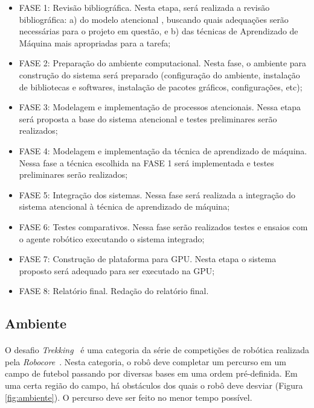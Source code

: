 \documentclass[11pt]{article}
\newcommand{\tit}[1]{\textit{#1}}
\begin{document}
\begin{itemize}
	\item FASE  1:  Revisão  bibliográfica. Nesta etapa, será realizada a revisão bibliográfica:  a) do  modelo  atencional \cite{esther}, buscando quais adequações serão necessárias para o projeto em questão, e b) das técnicas de Aprendizado de Máquina mais apropriadas para a tarefa;
	\item FASE  2:  Preparação do ambiente computacional. Nesta fase, o ambiente para construção do sistema será preparado (configuração do ambiente, instalação de bibliotecas e softwares, instalação de pacotes gráficos, configurações, etc); 
	\item FASE  3:  Modelagem e implementação de processos atencionais.  Nessa  etapa  será proposta a base do sistema  atencional e testes preliminares serão realizados;
	\item FASE  4:  Modelagem e implementação da técnica de aprendizado de máquina.  Nessa  fase  a  técnica escolhida na FASE 1 será implementada e testes preliminares serão realizados; 
	\item FASE  5:  Integração dos sistemas. Nessa fase será realizada a integração do sistema atencional à técnica de aprendizado de máquina;
	\item FASE  6:  Testes comparativos. Nessa fase serão realizados testes  e  ensaios  com  o  agente  robótico executando o sistema integrado;
	\item FASE  7:  Construção de plataforma para GPU. Nesta etapa o sistema proposto será adequado para ser executado na GPU;
	\item FASE  8:  Relatório final. Redação do relatório final.
\end{itemize}

\subsection{Ambiente}
\paragraph{}
O desafio \tit{Trekking}~\cite{trekking_regras} é uma categoria da série de 
competições de robótica realizada pela \tit{Robocore}~\cite{robocore}. 
Nesta categoria, o robô deve completar um percurso em 
um campo de futebol passando por diversas bases em uma ordem pré-definida.
Em uma certa região do campo, há obstáculos dos quais o robô deve desviar (Figura \ref{fig:ambiente}). 
O percurso deve ser feito no menor tempo possível.
\end{document}
